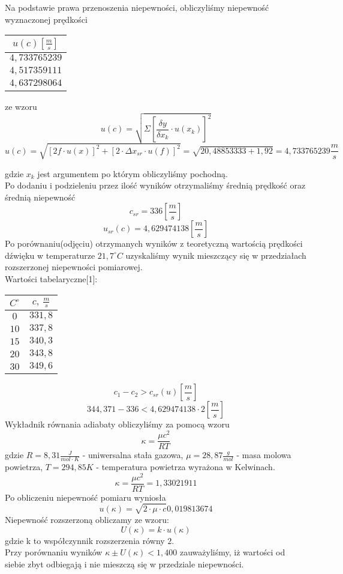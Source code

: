 \documentclass{article}
\begin{document}
Na podstawie prawa przenoszenia niepewności, obliczyliśmy niepewność wyznaczonej prędkości
\begin{center}
    \begin{tabular}{|c|}
    \hline
    $u(c) [\frac{m}{s}]$ \\ \hline
    $4,733765239$\\ \hline
    $4,517359111$\\ \hline
    $4,637298064$\\ \hline    
    \end{tabular}
\end{center}
ze wzoru 
$$u(c) = \sqrt{\Sigma[\frac{\delta y}{\delta x_k} \cdot u(x_k)]^2}$$
$$u(c) = \sqrt{[2f \cdot u(x)]^2 + [2 \cdot \Delta x_{sr} \cdot u(f)]^2} = \sqrt{20,48853333 + 1,92} = 4,733765239 \frac{m}{s}$$ 

gdzie $x_k$ jest argumentem po którym obliczyliśmy pochodną.\\
Po dodaniu i podzieleniu przez ilość wyników otrzymaliśmy średnią prędkość oraz średnią niepewność
$$c_{sr} = 336 [\frac{m}{s}]$$
$$u_{sr}(c) = 4,629474138 [\frac{m}{s}]$$
Po porównaniu(odjęciu) otrzymanych wyników z teoretyczną wartością prędkości dźwięku w temperaturze $21,7^{\circ}C$ uzyskaliśmy wynik  mieszczący się w przedziałach rozszerzonej niepewności pomiarowej.\\
Wartości tabelaryczne[1]:
\begin{center}
    \begin{tabular}{|c|c|}
    \hline
    $C^{\circ}$ & $c,\ \frac{m}{s} $ \\ \hline
    $0$ & $331,8$\\ \hline
    $10$ & $337,8$\\ \hline
    $15$ & $340,3$\\ \hline  
    $20$ & $343,8$\\ \hline 
    $30$ & $349,6$\\ \hline   
    \end{tabular}
\end{center}
$$c_1 - c_2 > c_{sr}(u) [\frac{m}{s}]$$
$$344,371 - 336 < 4,629474138 \cdot 2 [\frac{m}{s}]$$
Wykładnik równania adiabaty obliczyliśmy za pomocą wzoru 
$$\kappa = \frac{\mu c^2}{RT}$$
gdzie $R = 8,31 \frac{J}{mol \cdot K}$ - uniwersalna stała gazowa, $\mu = 28,87 \frac{g}{mol}$ - masa molowa powietrza, $T = 294,85 K$ - temperatura powietrza wyrażona w Kelwinach.
$$\kappa = \frac{\mu c^2}{RT} = 1,33021911$$
Po obliczeniu niepewność pomiaru wyniosła
$$u(\kappa ) = \sqrt{2 \cdot \mu \cdot c} 0,019813674$$
Niepewność rozszerzoną obliczamy ze wzoru:
$$U(\kappa )=k\cdot u(\kappa )$$
gdzie k to współczynnik rozszerzenia równy $2$.\\
Przy porównaniu wyników $\kappa \pm U(\kappa ) < 1,400$ zauważyliśmy, iż wartości od siebie zbyt odbiegają i nie mieszczą się w przedziale niepewności.
\end{document}
